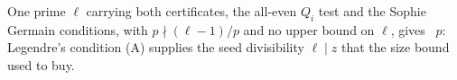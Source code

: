 \begin{theorem}\label{thm:jointcert}
  \leanok
  One prime $\ell$ carrying both certificates, the all-even $Q_i$ test and the Sophie
  Germain conditions, with $p \nmid (\ell-1)/p$ and no upper bound on $\ell$, gives
  ~$p$: Legendre's condition (A) supplies the seed
  divisibility $\ell \mid z$ that the size bound used to buy.
\end{theorem}
